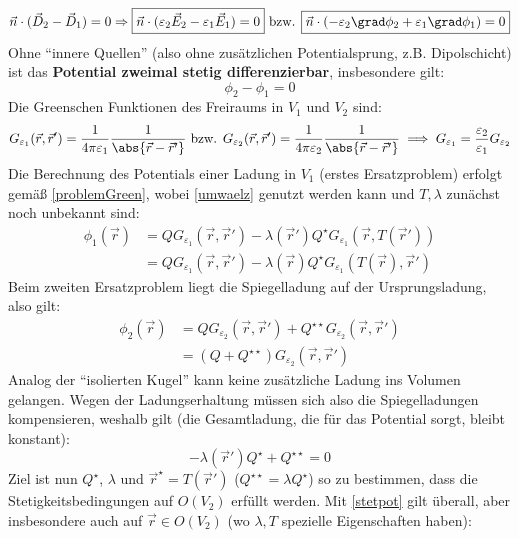 		  	\begin{equation}\label{normE}
		  		\vec{n}\cdot (\vec{D} _2 - \vec{D} _1 ) = 0 \Rightarrow \boxed{\vec{n}\cdot (\varepsilon_2\vec{E}_2 - \varepsilon_1\vec{E}_1 ) =0 } \text{ bzw. } \boxed{\vec{n}\cdot (-\varepsilon_2\grad \phi_2 + \varepsilon_1\grad \phi_1 ) =0 }
		  	\end{equation}
		  	 Ohne \enquote{innere Quellen} (also ohne zusätzlichen Potentialsprung, z.B. Dipolschicht) ist das \textbf{Potential zweimal stetig differenzierbar},  insbesondere gilt: 
		  	 \begin{equation}\label{stetpot}
		  	 	\boxed{\phi_2-\phi_1 = 0}
		  	 \end{equation}
		  	  Die Greenschen Funktionen des Freiraums in $V_1$ und $V_2$ sind:
		  	\begin{equation}
		  		G_{\varepsilon_1}(\vec{r} , \vec{r}' ) = \frac{1}{4\pi\varepsilon_1} \frac{1}{\abs{\vec{r}  - \vec{r}' }} \text{ bzw. }         G_{\varepsilon_2}(\vec{r} , \vec{r}' ) = \frac{1}{4\pi\varepsilon_2} \frac{1}{\abs{\vec{r}  - \vec{r}' }} \implies G_{\varepsilon_1}= \frac{\varepsilon_2}{\varepsilon_1} G_{\varepsilon_2}
		  	\end{equation}
		  	 Die Berechnung des Potentials einer Ladung in $V_1$ (erstes Ersatzproblem) erfolgt gemäß \ref{problemGreen}, wobei \ref{umwaelz} genutzt werden kann und $T,\lambda$ zunächst noch unbekannt sind:
		  	\begin{equation}\begin{split}
		  			\phi_1(\vec{r} ) & = Q G_{\varepsilon_1}(\vec{r} , \vec{r}' ) -  \lambda(\vec{r}' )Q^\star G_{\varepsilon_1}(\vec{r} , T(\vec{r}' ))\\
		  			& = Q G_{\varepsilon_1}(\vec{r} , \vec{r}' ) - \lambda(\vec{r} ) Q^\star G_{\varepsilon_1}(T(\vec{r} ), \vec{r}' )
		  	\end{split}\end{equation}
		  	 Beim zweiten Ersatzproblem liegt die Spiegelladung auf der Ursprungsladung, also gilt:
		  	\begin{equation}\begin{split}
		  			\phi_2(\vec{r} ) & = Q G_{\varepsilon_2}(\vec{r} , \vec{r}' ) +  Q^{\star\star} G_{\varepsilon_2}(\vec{r} , \vec{r}' )\\
		  			& = \left( Q +  Q^{\star\star}\right) G_{\varepsilon_2}(\vec{r} , \vec{r}' )
		  	\end{split}\end{equation}
		  	 Analog der \enquote{isolierten Kugel} kann keine zusätzliche Ladung ins Volumen gelangen. Wegen der Ladungserhaltung müssen sich also die Spiegelladungen kompensieren, weshalb gilt (die Gesamtladung, die für das Potential sorgt, bleibt konstant): \begin{equation}\boxed{-\lambda(\vec{r}' )Q^\star+Q^{\star\star}= 0}\end{equation}  Ziel ist nun $Q^\star$, $\lambda$ und $\vec{r} ^\star=T(\vec{r}' )$ ($Q^{\star\star}=\lambda Q^\star$) so zu bestimmen, dass die Stetigkeitsbedingungen auf $O(V_2)$ erfüllt werden. Mit \ref{stetpot} gilt überall, aber insbesondere auch auf $\vec{r} \in O(V_2)$ (wo $\lambda,T$ spezielle Eigenschaften haben):
